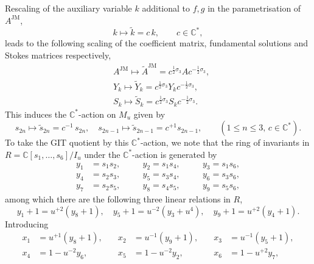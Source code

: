 \documentclass[a4paper,reqno]{amsart}
\numberwithin{equation}{section}
\newcommand{\C}{\mathbb{C}}
\numberwithin{equation}{section}
\begin{document}
Rescaling of the auxiliary variable $k$ additional to $f,g$ in the parametrisation of $A^{\operatorname{JM}}$,
\begin{equation*}
    k\mapsto \widetilde{k}=c\, k, \qquad c\in \C^*,
\end{equation*}
leads to the following scaling of the coefficient matrix, fundamental solutions and Stokes matrices respectively,
\begin{align*}
    &A^{\operatorname{JM}}\mapsto \widetilde{A}^{\operatorname{JM}}=c^{\tfrac{1}{2}\sigma_3}Ac^{-\tfrac{1}{2}\sigma_3},\\
    &Y_{k}\mapsto \widetilde{Y}_k=c^{\tfrac{1}{2}\sigma_3}Y_kc^{-\tfrac{1}{2}\sigma_3},\\
    &S_k\mapsto \widetilde{S}_k=c^{\tfrac{1}{2}\sigma_3}S_k c^{-\tfrac{1}{2}\sigma_3}.
\end{align*}
This induces the $\C^*$-action on $M_u$ given by 
\begin{equation*}
    s_{2n}\mapsto \widetilde{s}_{2n}=c^{-1}\, s_{2n},\quad s_{2n-1}\mapsto \widetilde{s}_{2n-1}=c^{+1} s_{2n-1},\qquad (1\leq n\leq 3,\,c\in\mathbb{C}^*).
\end{equation*}
To take the GIT quotient by this $\C^*$-action, we note that the ring of invariants in $R=\C[s_1,\dots,s_6]/I_u$ under the $\C^*$-action is generated by 
\begin{equation} \label{eq:ytosPII}
    \begin{aligned}
    y_1 &= s_1 s_2, &\quad &y_2 = s_1 s_4, &\quad &y_3 = s_1 s_6, \\
    y_4 &= s_2 s_3, &\quad &y_5 = s_3 s_4, &\quad &y_6 = s_3 s_6, \\
    y_7 &= s_2 s_5, &\quad &y_8 = s_4 s_5, &\quad &y_9 = s_5 s_6,
    \end{aligned}
\end{equation}
among which there are the following three linear relations in $R$,
\begin{equation*}
    y_1+1=u^{+2}( y_8+1),\quad y_5+1=u^{-2} (y_3+ u^{4}) , \quad y_9+1=u^{+2}(y_4+1).
\end{equation*}
Introducing 
\begin{equation}\label{eq:xtoyPII}
    \begin{aligned}
    x_1&=u^{+1} \left(y_8+1\right), & \quad 
    x_2&=u^{-1} \left(y_9+1\right), &\quad 
    x_3&=u^{-1}\left(y_5+1\right),
     \\
    x_4&=1-u^{-2} y_6,&\quad 
    x_5&= 1- u^{-2}y_2,&\quad 
    x_6&=1-u^{+2} y_7, 
    \end{aligned}
\end{equation}
\end{document}
